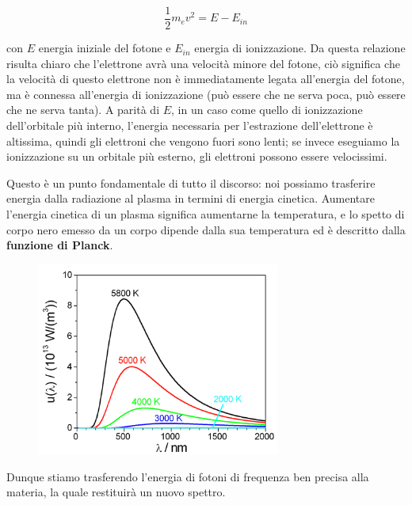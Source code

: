 $$\frac{1}{2}m_{e}v^{2}=E-E_{in}$$

con $E$ energia iniziale del fotone e $E_{in}$ energia di ionizzazione. Da questa relazione risulta chiaro che l'elettrone avrà una velocità minore del fotone, ciò significa che la velocità di questo elettrone non è immediatamente legata all'energia del fotone, ma è connessa all'energia di ionizzazione (può essere che ne serva poca, può essere che ne serva tanta). A parità di $E$, in un caso come quello di ionizzazione dell'orbitale più interno, l'energia necessaria per l'estrazione dell'elettrone è altissima, quindi gli elettroni che vengono fuori sono lenti; se invece eseguiamo la ionizzazione su un orbitale più esterno, gli elettroni possono essere velocissimi.

Questo è un punto fondamentale di tutto il discorso: noi possiamo trasferire energia dalla radiazione al plasma in termini di energia cinetica. Aumentare l'energia cinetica di un plasma significa aumentarne la temperatura, e lo spetto di corpo nero emesso da un corpo dipende dalla sua temperatura ed è descritto dalla \textbf{funzione di Planck}.

\begin{figure}[H]
   \centering
   \includegraphics[width=8cm]{28-10.4(funzione di Planck).png}
   \label{fig:28-10.4funzione di Planck}
\end{figure}

Dunque stiamo trasferendo l'energia di fotoni di frequenza ben precisa alla materia, la quale restituirà un nuovo spettro. 

